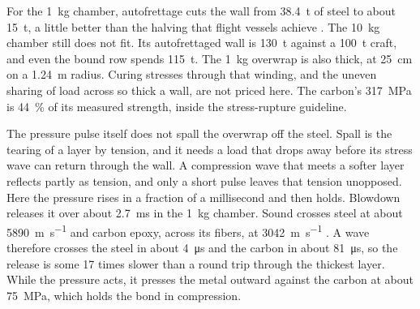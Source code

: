 \documentclass{article}
\begin{document}
For the \SI{1}{\kilogram} chamber, autofrettage cuts the wall from \SI{38.4}{\tonne} of steel to about \SI{15}{\tonne}, a little better than the halving that flight vessels achieve \cite{mclaughlan2011_copv_primer}. The \SI{10}{\kilogram} chamber still does not fit. Its autofrettaged wall is \SI{130}{\tonne} against a \SI{100}{\tonne} craft, and even the bound row spends \SI{115}{\tonne}. The \SI{1}{\kilogram} overwrap is also thick, at \SI{25}{\centi\meter} on a \SI{1.24}{\meter} radius. Curing stresses through that winding, and the uneven sharing of load across so thick a wall, are not priced here. The carbon's \SI{317}{\mega\pascal} is \SI{44}{\percent} of its measured strength, inside the stress-rupture guideline.

The pressure pulse itself does not spall the overwrap off the steel. Spall is the tearing of a layer by tension, and it needs a load that drops away before its stress wave can return through the wall. A compression wave that meets a softer layer reflects partly as tension, and only a short pulse leaves that tension unopposed. Here the pressure rises in a fraction of a millisecond and then holds. Blowdown releases it over about \SI{2.7}{\milli\second} in the \SI{1}{\kilogram} chamber. Sound crosses steel at about \SI{5890}{\meter\per\second} \cite{evident_sound_velocities} and carbon epoxy, across its fibers, at \SI{3042}{\meter\per\second} \cite{alexander2012_cfrp_planar_impact}. A wave therefore crosses the steel in about \SI{4}{\micro\second} and the carbon in about \SI{81}{\micro\second}, so the release is some 17 times slower than a round trip through the thickest layer. While the pressure acts, it presses the metal outward against the carbon at about \SI{75}{\mega\pascal}, which holds the bond in compression.
\end{document}

